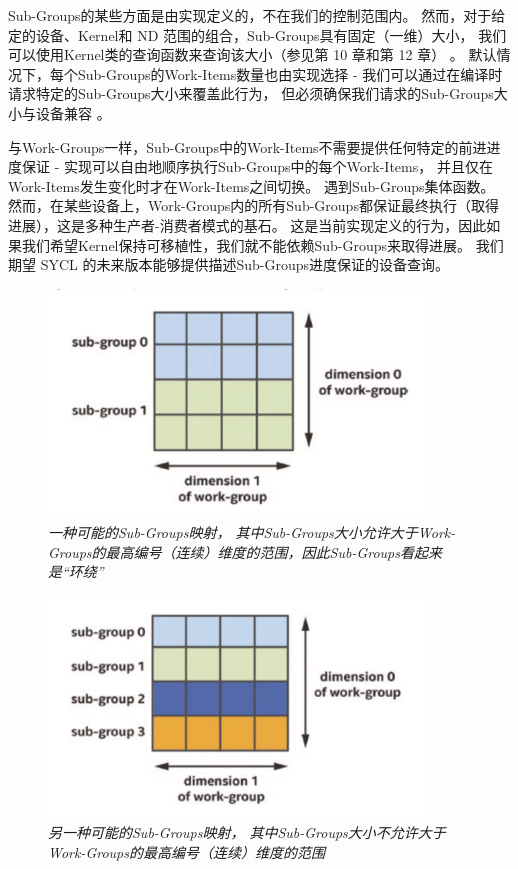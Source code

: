 Sub-Groups的某些方面是由实现定义的，不在我们的控制范围内。 
然而，对于给定的设备、Kernel和 ND 范围的组合，Sub-Groups具有固定（一维）大小，
我们可以使用Kernel类的查询函数来查询该大小（参见第 10 章和第 12 章） 。 
默认情况下，每个Sub-Groups的Work-Items数量也由实现选择 - 
我们可以通过在编译时请求特定的Sub-Groups大小来覆盖此行为，
但必须确保我们请求的Sub-Groups大小与设备兼容 。

与Work-Groups一样，Sub-Groups中的Work-Items不需要提供任何特定的前进进度保证 - 
实现可以自由地顺序执行Sub-Groups中的每个Work-Items，
并且仅在Work-Items发生变化时才在Work-Items之间切换。 遇到Sub-Groups集体函数。 
然而，在某些设备上，Work-Groups内的所有Sub-Groups都保证最终执行（取得进展），这是多种生产者-消费者模式的基石。 
这是当前实现定义的行为，因此如果我们希望Kernel保持可移植性，我们就不能依赖Sub-Groups来取得进展。 
我们期望 SYCL 的未来版本能够提供描述Sub-Groups进度保证的设备查询。

\begin{figure}[H]
	\centering
	\includegraphics[width=0.9\textwidth]{figs/F4.13.png}
	\caption{\textit{一种可能的Sub-Groups映射，
	其中Sub-Groups大小允许大于Work-Groups的最高编号（连续）维度的范围，因此Sub-Groups看起来是“环绕”}}
\end{figure}


\begin{figure}[H]
	\centering
	\includegraphics[width=0.9\textwidth]{figs/F4.14.png}
	\caption{\textit{另一种可能的Sub-Groups映射，
	其中Sub-Groups大小不允许大于Work-Groups的最高编号（连续）维度的范围}}
\end{figure}

